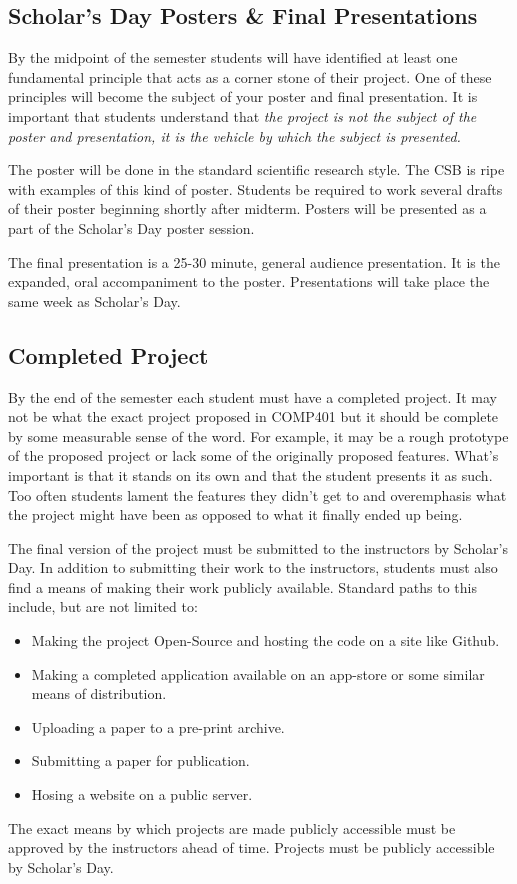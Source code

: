 \documentclass[10pt]{article}
\begin{document}
\subsection{Scholar's Day Posters \& Final Presentations}

By the midpoint of the semester students will have identified at least one fundamental principle that acts as a corner stone of their project. One of these principles will become the subject of your poster and final presentation. It is important that students understand that \textit{the project is not the subject of the poster and presentation, it is the vehicle by which the subject is presented.}

The poster will be done in the standard scientific research style. The CSB is ripe with examples of this kind of poster. Students be required to work several drafts of their poster beginning shortly after midterm. Posters will be presented as a part of the Scholar's Day poster session. 

The final presentation is a 25-30 minute, general audience presentation. It is the expanded, oral accompaniment to the poster. Presentations will take place the same week as Scholar's Day.

\subsection{Completed Project}
 
By the end of the semester each student must have a completed project. It may not be what the exact project proposed in COMP401 but it should be complete by some measurable sense of the word. For example, it may be a rough prototype of the proposed project or lack some of the originally proposed features. What's important is that it stands on its own and that the student presents it as such. Too often students lament the features they didn't get to and overemphasis what the project might have been as opposed to what it finally ended up being.   

The final version of the project must be submitted to the instructors by Scholar's Day. In addition to submitting their work to the instructors, students must also find a means of making their work publicly available. Standard paths to this include, but are not limited to:
\begin{itemize}
\item Making the project Open-Source and hosting the code on a site like Github.
\item Making a completed application available on an app-store or some similar means of distribution. 
\item Uploading a paper to a pre-print archive.
\item Submitting a paper for publication. 
\item Hosing a website on a public server. 
\end{itemize}
The exact means by which projects are made publicly accessible must be approved by the instructors ahead of time. Projects must be publicly accessible by Scholar's Day.
\end{document}
